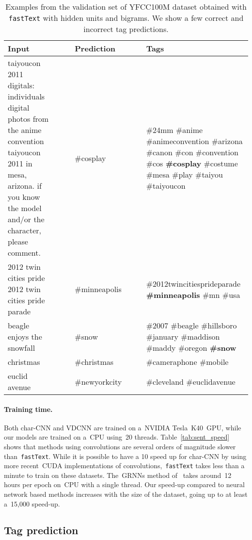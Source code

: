 \begin{table*}[t]
\centering
\small
\begin{tabular}{p{20em}clcp{15em}}
\toprule
Input &~~& Prediction &~~& Tags \\
\midrule
taiyoucon 2011 digitals: individuals digital photos from the anime convention
taiyoucon 2011 in mesa, arizona. if you know the model and/or the character,
please comment.
&&
{\#}cosplay
&&
{\#}24mm {\#}anime {\#}animeconvention {\#}arizona {\#}canon {\#}con {\#}convention {\#}cos \textbf{{\#}cosplay} {\#}costume {\#}mesa {\#}play {\#}taiyou {\#}taiyoucon
\\ 
\midrule[0.02em]
2012 twin cities pride 2012 twin cities pride parade
&&
{\#}minneapolis
&&
{\#}2012twincitiesprideparade \textbf{{\#}minneapolis} {\#}mn {\#}usa 
\\
\midrule[0.02em]
beagle enjoys the snowfall 
&&
{\#}snow
&&
{\#}2007 {\#}beagle {\#}hillsboro {\#}january {\#}maddison {\#}maddy {\#}oregon \textbf{{\#}snow} 
\\
\midrule[0.08em]
christmas && {\#}christmas && {\#}cameraphone {\#}mobile
\\
\midrule[0.02em]
euclid avenue && {\#}newyorkcity && {\#}cleveland {\#}euclidavenue 
\\
\bottomrule
\end{tabular}
\caption{Examples from the validation set of YFCC100M dataset obtained with \texttt{fastText}
with  hidden units and bigrams. We show a few correct and incorrect tag predictions.
}\label{tab:tag_ex}
\end{table*}

\paragraph{Training time.}
Both char-CNN and VDCNN are trained on a~NVIDIA Tesla~K40~GPU, while our
models are trained on a~CPU using~20 threads.
Table~\ref{tab:sent_speed} shows that methods using convolutions are several orders of
magnitude slower than~\texttt{fastText}. While it is
possible to have a 10 speed up for char-CNN by using more recent~CUDA
implementations of convolutions,~\texttt{fastText} takes less than a minute to
train on these datasets. The~GRNNs method of~ takes
around~12 hours per epoch on~CPU with a single thread.
Our speed-up compared to neural network based methods increases with the size
of the dataset, going up to at least a~15,000 speed-up.

\subsection{Tag prediction}

